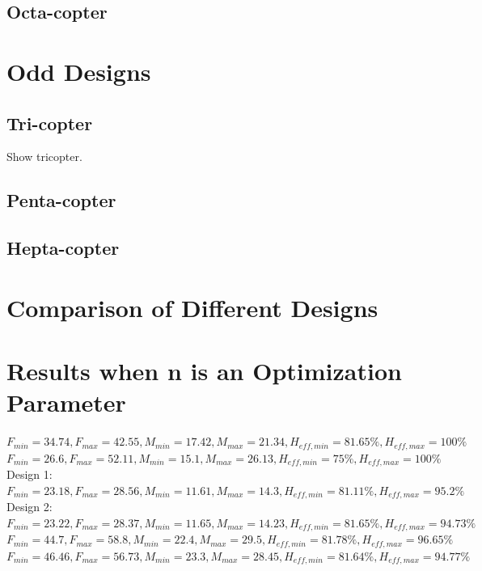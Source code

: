 \subsection{Octa-copter}
\label{sec:octa_copter}

\section{Odd Designs}
\label{sec:odd_designs}

\subsection{Tri-copter}
\label{sec:tri_copter}
Show tricopter.

\subsection{Penta-copter}
\label{sec:penta_copter}

\subsection{Hepta-copter}
\label{sec:hepta_copter}

\section{Comparison of Different Designs}
\label{sec:comparison}
\section{Results when n is an Optimization Parameter}
\label{sec:result_n}

$F_{min} = 34.74, F_{max} = 42.55 , M_{min} = 17.42,  M_{max} = 21.34,  H_{eff,min} = 81.65\%,  H_{eff,max} = 100\%$\\
$F_{min} = 26.6, F_{max} = 52.11 , M_{min} = 15.1,  M_{max} = 26.13,  H_{eff,min} = 75\%,  H_{eff,max} = 100\%$\\
Design 1: $F_{min} = 23.18, F_{max} = 28.56 , M_{min} = 11.61,  M_{max} = 14.3,  H_{eff,min} = 81.11\%,  H_{eff,max} = 95.2\%$\\
Design 2: $F_{min} = 23.22, F_{max} = 28.37 , M_{min} = 11.65,  M_{max} = 14.23,  H_{eff,min} = 81.65\%, H_{eff,max} = 94.73\%$\\
$F_{min} = 44.7, F_{max} = 58.8 , M_{min} = 22.4,  M_{max} = 29.5,  H_{eff,min} = 81.78\%,  H_{eff,max} = 96.65\%$\\
$F_{min} = 46.46, F_{max} = 56.73 , M_{min} = 23.3,  M_{max} = 28.45,  H_{eff,min} = 81.64\%, H_{eff,max} = 94.77\%$\\

